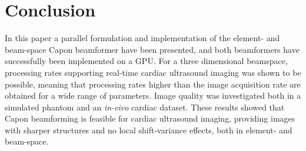 \documentclass[journal]{IEEEtran}
\begin{document}
\section{Conclusion}\label{sec:con}
In this paper a parallel formulation and implementation of the element- and beam-space Capon beamformer have been presented, and
both beamformers have successfully been implemented on a GPU. For a three dimensional beamspace, processing rates supporting real-time cardiac ultrasound imaging was shown to be possible, meaning that processing rates higher than the image acquisition rate are obtained for a wide range of parameters. Image quality was investigated both in a simulated phantom and an \textit{in-vivo} cardiac dataset. These results showed that Capon beamforming is feasible for cardiac ultrasound imaging, providing images with sharper structures and no local shift-variance effects, both in element- and beam-space.




%
%
\end{document}
